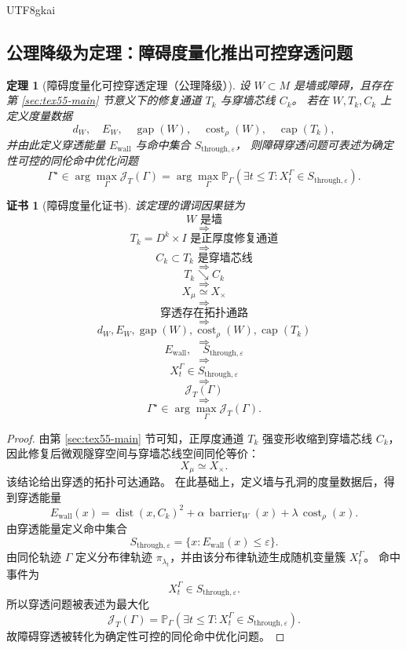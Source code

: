 \documentclass[12pt]{article}
\newtheorem{theorem}{定理}[section]
\newtheorem{Certificate}{证书}[section]
\begin{document}
\begin{CJK*}{UTF8}{gkai}
\subsection{公理降级为定理：障碍度量化推出可控穿透问题}
\label{subsec:tex55-metric-tunnel-axiom-theorem}

\begin{theorem}[障碍度量化可控穿透定理（公理降级）]
\label{thm:tex55-metric-controllable-tunneling}
设 \(W\subset M\) 是墙或障碍，且存在第 \ref{sec:tex55-main} 节意义下的修复通道 \(T_k\) 与穿墙芯线 \(C_k\)。
若在 \(W,T_k,C_k\) 上定义度量数据
\[
  d_W,\quad E_W,\quad \operatorname{gap}(W),
  \quad
  \operatorname{cost}_\rho(W),
  \quad
  \operatorname{cap}(T_k),
\]
并由此定义穿透能量 \(E_{\mathrm{wall}}\) 与命中集合 \(S_{\mathrm{through},\varepsilon}\)，
则障碍穿透问题可表述为确定性可控的同伦命中优化问题
\[
  \Gamma^\star
  \in
  \arg\max_\Gamma \mathcal J_T(\Gamma)
  =
  \arg\max_\Gamma
  \mathbb P_\Gamma
  \left(
  \exists t\le T:
  X_t^\Gamma\in S_{\mathrm{through},\varepsilon}
  \right).
\]
\end{theorem}

\begin{Certificate}[障碍度量化证书]
\label{cert:tex55-metric-controllable-tunneling}
该定理的谓词因果链为
\[
  W\text{ 是墙}
\]
\[
  \Longrightarrow
\]
\[
  T_k=D^k\times I\text{ 是正厚度修复通道}
\]
\[
  \Longrightarrow
\]
\[
  C_k\subset T_k\text{ 是穿墙芯线}
\]
\[
  \Longrightarrow
\]
\[
  T_k\searrow C_k
\]
\[
  \Longrightarrow
\]
\[
  X_\mu\simeq X_\times
\]
\[
  \Longrightarrow
\]
\[
  \text{穿透存在拓扑通路}
\]
\[
  \Longrightarrow
\]
\[
  d_W,E_W,\operatorname{gap}(W),\operatorname{cost}_\rho(W),\operatorname{cap}(T_k)
\]
\[
  \Longrightarrow
\]
\[
  E_{\mathrm{wall}},\quad S_{\mathrm{through},\varepsilon}
\]
\[
  \Longrightarrow
\]
\[
  X_t^\Gamma\in S_{\mathrm{through},\varepsilon}
\]
\[
  \Longrightarrow
\]
\[
  \mathcal J_T(\Gamma)
\]
\[
  \Longrightarrow
\]
\[
  \Gamma^\star\in\arg\max_\Gamma\mathcal J_T(\Gamma).
\]
\end{Certificate}

\begin{proof}
由第 \ref{sec:tex55-main} 节可知，正厚度通道 \(T_k\) 强变形收缩到穿墙芯线 \(C_k\)，
因此修复后微观隧穿空间与穿墙芯线空间同伦等价：
\[
  X_\mu\simeq X_\times.
\]
该结论给出穿透的拓扑可达通路。
在此基础上，定义墙与孔洞的度量数据后，得到穿透能量
\[
  E_{\mathrm{wall}}(x)
  =
  \operatorname{dist}(x,C_k)^2
  +
  \alpha\,\operatorname{barrier}_W(x)
  +
  \lambda\,\operatorname{cost}_\rho(x).
\]
由穿透能量定义命中集合
\[
  S_{\mathrm{through},\varepsilon}
  =
  \{x:E_{\mathrm{wall}}(x)\le\varepsilon\}.
\]
由同伦轨迹 \(\Gamma\) 定义分布律轨迹 \(\pi_{\lambda_t}\)，并由该分布律轨迹生成随机变量簇 \(X_t^\Gamma\)。
命中事件为
\[
  X_t^\Gamma\in S_{\mathrm{through},\varepsilon}.
\]
所以穿透问题被表述为最大化
\[
  \mathcal J_T(\Gamma)
  =
  \mathbb P_\Gamma
  \left(
  \exists t\le T:X_t^\Gamma\in S_{\mathrm{through},\varepsilon}
  \right).
\]
故障碍穿透被转化为确定性可控的同伦命中优化问题。
\end{proof}


\end{CJK*}
\end{document}
